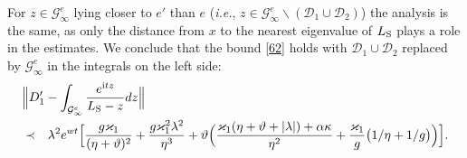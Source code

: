 \documentclass[letterpaper,onecolumn,11pt,accepted=2021-12-09]{quantumarticle}
\numberwithin{equation}{section}
\newcommand{\s}{{\rm S}}
\renewcommand{\i}{{\rm i}}
\begin{document}
For $z\in{\mathcal G}_\infty^e$ lying closer to $e'$ than $e$ ({\em i.e.}, $z\in {\mathcal G}_\infty^e\backslash( {\mathcal D}_1\cup{\mathcal D}_2)$) the analysis is the same, as only the distance from $x$ to the nearest eigenvalue of $L_\s$ plays a role in the estimates. We conclude that the bound \eqref{62} holds with ${\mathcal D}_1\cup{\mathcal D}_2$ replaced by ${\mathcal G}_\infty^e$ in the integrals on the left side:
\begin{eqnarray}
	\lefteqn{
\Big\| D'_1- \int_{{\mathcal G}_\infty^e} \frac{e^{\i tz}}{L_\s-z} dz \Big\| 
}
\label{D_1'}\\
&\prec & 
\lambda^2 e^{wt}\Big[ \frac{g\varkappa_1}{(\eta+\vartheta)^2} + \frac{g\varkappa^2_1\lambda^2}{\eta^3} +\vartheta \Big(\frac{\varkappa_1(\eta+\vartheta+|\lambda|)+\alpha\kappa}{\eta^2} +\frac{\varkappa_1}{g}\big(1/\eta +1/g\big)\Big)
\Big].\nonumber
\end{eqnarray}
\medskip
\end{document}
